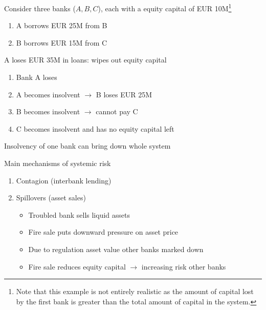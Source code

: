 \documentclass{beamer}
\begin{document}
\begin{frame}
 Consider three banks ($A,B,C$), each with a equity capital of EUR 10M\footnote{Note that this example is not entirely realistic as the amount of capital lost by the first bank is greater than the total amount of capital in the system.}  
 \begin{enumerate}
   \item A borrows EUR 25M from B
   \item B borrows EUR 15M from C 
 \end{enumerate}
 \medskip
 A loses EUR 35M in loans: wipes out equity capital
\begin{enumerate}
  \item Bank A loses 
  \item A becomes insolvent $\rightarrow$ B loses EUR 25M
  \item B becomes insolvent $\rightarrow$ cannot pay C
  \item C becomes insolvent and has no equity capital left
\end{enumerate}
\medskip
Insolvency of one bank can bring down whole system
\end{frame}

\begin{frame}
  Main mechanisms of systemic risk
  \medskip
\begin{enumerate}
  \item Contagion (interbank lending)
  \item Spillovers (asset sales)
  \begin{itemize}
    \item Troubled bank sells liquid assets
    \item Fire sale puts downward pressure on asset price
    \item Due to regulation asset value other banks marked down
    \item Fire sale reduces equity capital $\rightarrow$ increasing risk other banks
  \end{itemize}
\end{enumerate}
\end{frame}
\end{document}
